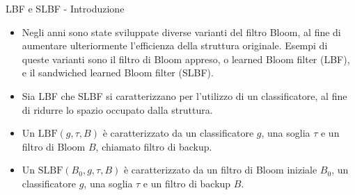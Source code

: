 \documentclass{beamer}
\begin{document}
\begin{frame}{LBF e SLBF - Introduzione}
    \begin{itemize}
        \item Negli anni sono state sviluppate diverse varianti del filtro Bloom, al fine di aumentare ulteriormente l'efficienza della struttura originale. Esempi di queste varianti sono il filtro di Bloom appreso, o learned Bloom filter \cite{kraska2018case} (LBF), e il sandwiched learned Bloom filter \cite{10.5555/3326943.3326986} (SLBF).
        \item Sia LBF che SLBF si caratterizzano per l'utilizzo di un classificatore, al fine di ridurre lo spazio occupato dalla struttura.
        \item Un $\mathrm{LBF}(g, \tau, B)$ è caratterizzato da un classificatore $g$, una soglia $\tau$ e un filtro di Bloom $B$, chiamato filtro di backup.
        \item Un $\mathrm{SLBF}(B_0, g, \tau, B)$ è caratterizzato da un filtro di Bloom iniziale $B_0$, un classificatore $g$, una soglia $\tau$ e un filtro di backup $B$.
    \end{itemize}
\end{frame}
\end{document}

